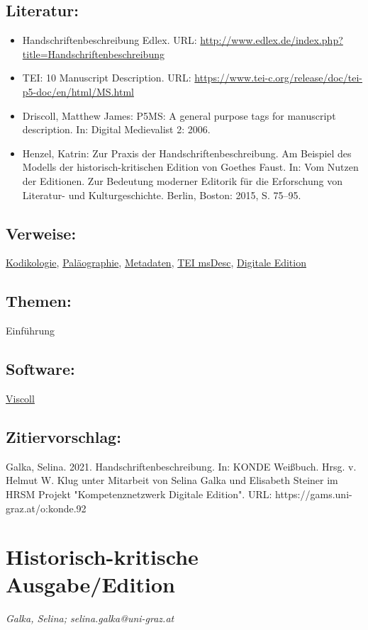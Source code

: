 \documentclass{article}
\begin{document}
        \subsection*{Literatur:}\begin{itemize}\item Handschriftenbeschreibung Edlex. URL: \url{http://www.edlex.de/index.php?title=Handschriftenbeschreibung}\item TEI: 10 Manuscript Description. URL: \url{https://www.tei-c.org/release/doc/tei-p5-doc/en/html/MS.html}\item Driscoll, Matthew James: P5MS: A general purpose tags for manuscript
                              description. In: Digital Medievalist 2: 2006.\item Henzel, Katrin: Zur Praxis der Handschriftenbeschreibung. Am Beispiel
                              des Modells der historisch-kritischen Edition von Goethes
                              Faust. In: Vom Nutzen der Editionen. Zur Bedeutung moderner
                              Editorik für die Erforschung von Literatur- und
                              Kulturgeschichte. Berlin, Boston: 2015, S. 75–95.\end{itemize}\subsection*{Verweise:}\href{https://gams.uni-graz.at/o:konde.103}{Kodikologie}, \href{https://gams.uni-graz.at/o:konde.155}{Paläographie}, \href{https://gams.uni-graz.at/o:konde.25}{Metadaten}, \href{https://gams.uni-graz.at/o:konde.179}{TEI msDesc}, \href{https://gams.uni-graz.at/o:konde.59}{Digitale Edition}\subsection*{Themen:}Einführung\subsection*{Software:}\href{https://github.com/leoba/VisColl}{Viscoll}\subsection*{Zitiervorschlag:}Galka, Selina. 2021. Handschriftenbeschreibung. In: KONDE Weißbuch. Hrsg. v. Helmut W. Klug unter Mitarbeit von Selina Galka und Elisabeth Steiner im HRSM Projekt "Kompetenznetzwerk Digitale Edition". URL: https://gams.uni-graz.at/o:konde.92\newpage\section*{Historisch-kritische Ausgabe/Edition} \emph{Galka, Selina; selina.galka@uni-graz.at }\\
        
\end{document}
